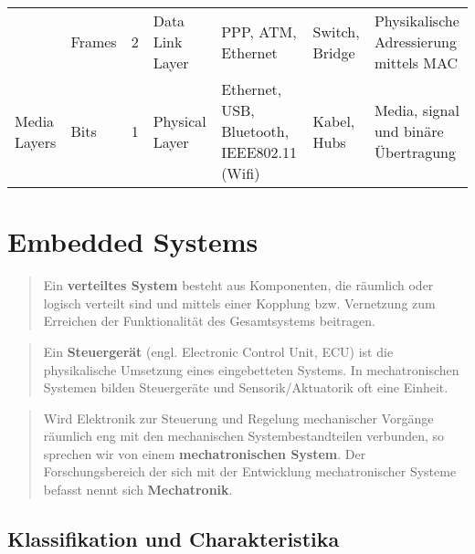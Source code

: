 \documentclass[
]{article}
\begin{document}
\begin{table}[]
\begin{tabular}{lllllll}
                               & \cellcolor[HTML]{FFCE93}Frames                 & \cellcolor[HTML]{FFCE93}2 & \cellcolor[HTML]{FFCE93}Data Link Layer    & \cellcolor[HTML]{FFCE93}PPP, ATM, Ethernet                          & \cellcolor[HTML]{FFCE93}Switch, Bridge & \cellcolor[HTML]{FFCE93}Physikalische Adressierung mittels MAC \\
\multirow{-3}{*}{Media Layers} & \cellcolor[HTML]{FFCCC9}Bits                   & \cellcolor[HTML]{FFCCC9}1 & \cellcolor[HTML]{FFCCC9}Physical Layer     & \cellcolor[HTML]{FFCCC9}Ethernet, USB, Bluetooth, IEEE802.11 (Wifi) & \cellcolor[HTML]{FFCCC9}Kabel, Hubs    & \cellcolor[HTML]{FFCCC9}Media, signal und binäre Übertragung  
\end{tabular}
\end{table}

\hypertarget{embedded-systems}{%
\section{Embedded Systems}\label{embedded-systems}}

\begin{quote}
Ein \textbf{verteiltes System} besteht aus Komponenten, die räumlich
oder logisch verteilt sind und mittels einer Kopplung bzw. Vernetzung
zum Erreichen der Funktionalität des Gesamtsystems beitragen.
\end{quote}

\begin{quote}
Ein \textbf{Steuergerät} (engl. Electronic Control Unit, ECU) ist die
physikalische Umsetzung eines eingebetteten Systems. In mechatronischen
Systemen bilden Steuergeräte und Sensorik/Aktuatorik oft eine Einheit.
\end{quote}

\begin{quote}
Wird Elektronik zur Steuerung und Regelung mechanischer Vorgänge
räumlich eng mit den mechanischen Systembestandteilen verbunden, so
sprechen wir von einem \textbf{mechatronischen System}. Der
Forschungsbereich der sich mit der Entwicklung mechatronischer Systeme
befasst nennt sich \textbf{Mechatronik}.
\end{quote}

\hypertarget{klassifikation-und-charakteristika}{%
\subsection{Klassifikation und
Charakteristika}\label{klassifikation-und-charakteristika}}
\end{document}
